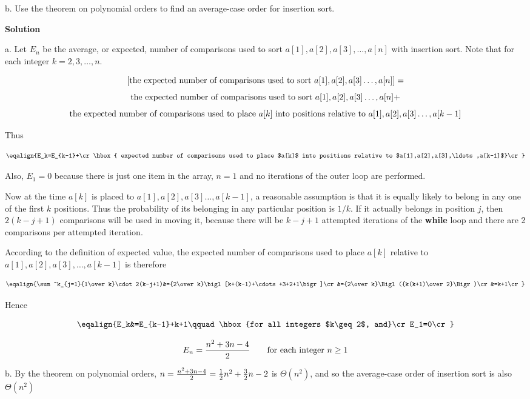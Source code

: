 \vskip 2mm
b. Use the theorem on polynomial orders to find an average-case order for insertion sort.

\vskip 3mm
{\bf Solution}

\vskip 1mm
a. Let $E_n$ be the average, or expected, number of comparisons used to sort $a[1],a[2],a[3],\ldots,a[n]$ with insertion sort. Note that for each integer $k=2,3,\ldots, n$.

$$\hbox{[the expected number of comparisons used to sort $a[1],a[2],a[3]\ldots,a[n]$]}=$$
$$\hbox{the expected number of comparisons used to sort $a[1],a[2],a[3]\ldots,a[n]$}+$$
$$\hbox{the expected number of comparisons used to place $a[k]$ into positions relative to $a[1],a[2],a[3]\ldots,a[k-1]$}$$

\vskip 1mm
Thus

$$\eqalign{E_k=E_{k-1}+\cr
	\hbox{ expected number of comparisons used to place $a[k]$ into positions relative to $a[1],a[2],a[3],\ldots,a[k-1]$}\cr}$$

Also, $E_1=0$ because there is just one item in the array, $n=1$ and no iterations of the outer loop are performed.

\vskip 1mm
Now at the time $a[k]$ is placed to $a[1],a[2],a[3]\ldots,a[k-1]$, a reasonable assumption is that it is equally likely to belong in any one of the first $k$ positions. Thus the probability of its belonging in any particular position is $1/k$. If it actually belongs in position $j$, then $2(k-j+1)$ comparisons will be used in moving it, because there will be $k-j+1$ attempted iterations of the {\bf while} loop and there are 2 comparisons per attempted iteration.

\vskip 1mm

According to the definition of expected value, the expected number of comparisons used to place $a[k]$ relative to $a[1],a[2],a[3],\ldots,a[k-1]$ is therefore

$$\eqalign{\sum^k_{j=1}{1\over k}\cdot 2(k-j+1)&={2\over k}\bigl[k+(k-1)+\cdots+3+2+1\bigr]\cr
						&={2\over k}\Bigl({k(k+1)\over 2}\Bigr)\cr
						&=k+1\cr}$$

Hence

$$\eqalign{E_k&=E_{k-1}+k+1\qquad\hbox{for all integers $k\geq 2$, and}\cr
			E_1=0\cr}$$

$$E_n={n^2+3n-4\over 2}\qquad\hbox{for each integer $n\geq 1$}$$

\vskip 3mm
b. By the theorem on polynomial orders, $n={n^2+3n-4\over 2}={1\over 2}n^2+{3\over 2}n-2$ is $\Theta(n^2)$, and so the average-case order of insertion sort is also $\Theta(n^2)$


\filbreak
\vfill\eject
\bye
